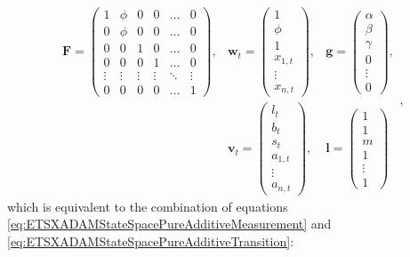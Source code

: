 \documentclass[]{book}
\theoremstyle{definition}
\theoremstyle{definition}
\theoremstyle{definition}
\theoremstyle{definition}
\theoremstyle{remark}
\begin{document}
\begin{equation}
  \begin{aligned}
    \mathbf{F} =
    \begin{pmatrix} 1 & \phi & 0 & 0 & \dots & 0 \\
                    0 & \phi & 0 & 0 & \dots & 0 \\
                    0 & 0 & 1 & 0 & \dots & 0 \\
                    0 & 0 & 0 & 1 & \dots & 0 \\
                    \vdots & \vdots & \vdots & \vdots & \ddots & \vdots \\
                    0 & 0 & 0 & 0 & \dots & 1
    \end{pmatrix},
    & \mathbf{w}_t = \begin{pmatrix} 1 \\ \phi \\ 1 \\ x_{1,t} \\ \vdots \\x_{n,t} \end{pmatrix},
    & \mathbf{g} = \begin{pmatrix} \alpha \\ \beta \\ \gamma \\ 0 \\ \vdots \\ 0 \end{pmatrix}, \\
    & \mathbf{v}_{t} = \begin{pmatrix} l_t \\ b_t \\ s_t \\ a_{1,t} \\ \vdots \\ a_{n,t} \end{pmatrix},
    & \mathbf{l} = \begin{pmatrix} 1 \\ 1 \\ m \\ 1 \\ \vdots \\ 1 \end{pmatrix}
  \end{aligned},
  \label{eq:ETSXADAMAAAMatrices}
\end{equation}
which is equivalent to the combination of equations \eqref{eq:ETSXADAMStateSpacePureAdditiveMeasurement} and \eqref{eq:ETSXADAMStateSpacePureAdditiveTransition}:
\end{document}
